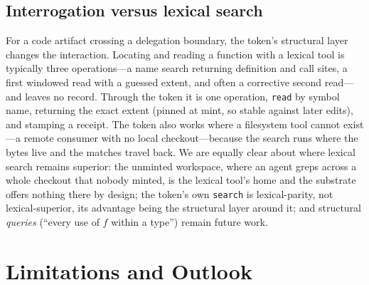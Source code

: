 \documentclass[10pt,twocolumn]{article}
\newcommand{\tok}[1]{\texttt{#1}}
\begin{document}
\subsection{Interrogation versus lexical search}
For a code artifact crossing a delegation boundary, the token's structural
layer changes the interaction. Locating and reading a function with a
lexical tool is typically three operations---a name search returning
definition and call sites, a first windowed read with a guessed extent,
and often a corrective second read---and leaves no record. Through the
token it is one operation, \tok{read} by symbol name, returning the exact
extent (pinned at mint, so stable against later edits), and stamping a
receipt. The token also works where a filesystem tool cannot exist---a
remote consumer with no local checkout---because the search runs where the
bytes live and the matches travel back. We are equally clear about where
lexical search remains superior: the unminted workspace, where an agent
greps across a whole checkout that nobody minted, is the lexical tool's
home and the substrate offers nothing there by design; the token's own
\tok{search} is lexical-parity, not lexical-superior, its advantage being
the structural layer around it; and structural \emph{queries}
(``every use of $f$ within a type'') remain future work.

\section{Limitations and Outlook}
\label{sec:limits}
\end{document}
